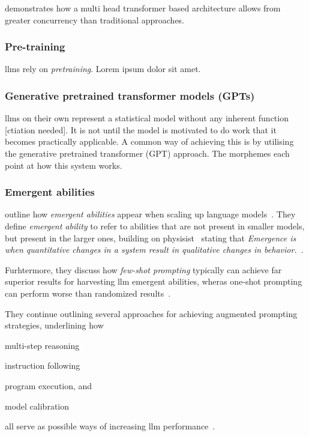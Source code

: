 
 demonstrates how a multi head transformer based architecture
allows from greater concurrency than traditional approaches.

\subsubsection*{Pre-training}

\acrshort{llms} rely on \textit{pretraining}.
Lorem ipsum dolor sit amet.

\subsubsection*{Generative pretrained transformer models (GPTs)}

\acrlong{llms} on their own represent a statistical model without any inherent
function [ctiation needed]. It is not until the model is motivated to do work
that it becomes practically applicable. A common way of achieving this is by
utilising the generative pretrained transformer (GPT) approach. The morphemes
each point at how this system works.


\subsubsection{Emergent abilities}\label{sec:emergentAbilities}

\citeauthor{emergentabilitiesLLM} outline how \textit{emergent abilities} appear
when scaling up language models~\cite[1]{emergentabilitiesLLM}. They define
\textit{emergent ability} to refer to abilities that are not present in smaller
models, but present in the larger ones\cite[1]{emergentabilitiesLLM}, building
on physisist~\citeauthor{anderson1972more} stating that \textit{Emergence is
    when quantitative changes in a system result in qualitative changes in
    behavior.}~\cite[2]{emergentabilitiesLLM}.

Furhtermore, they discuss how \textit{few-shot prompting} typically can achieve
far superior results for harvesting \acrshort{llm} emergent abilities, wheras
one-shot prompting can perform worse than randomized
results~\cite[3-4]{emergentabilitiesLLM}.

They continue outlining several approaches for achieving augmented prompting
strategies, underlining how \begin{inparaenum}
    \item multi-step reasoning
    \item instruction following
    \item program execution,
    and
    \item model calibration
\end{inparaenum}
all serve as possible ways of increasing \acrshort{llm} performance~\cite[5]{emergentabilitiesLLM}.

